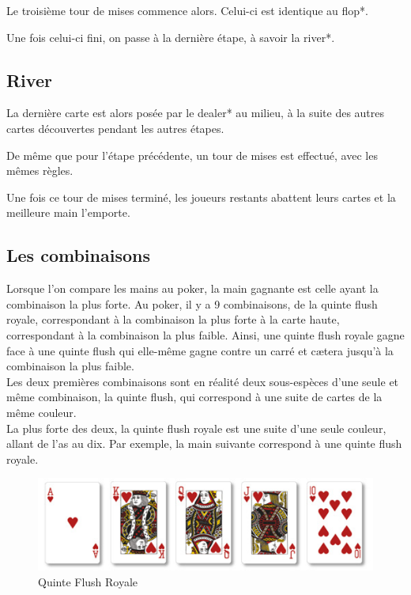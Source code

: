 \documentclass{report}
\begin{document}
Le troisième tour de mises commence alors. Celui-ci est identique au flop*.\par

Une fois celui-ci fini, on passe à la dernière étape, à savoir la river*.\par
\subsection{River}
\hspace{0.5cm}La dernière carte est alors posée par le dealer* au milieu, à la suite des autres cartes découvertes pendant les autres étapes. \par
De même que pour l'étape précédente, un tour de mises est effectué, avec les mêmes règles.\par
Une fois ce tour de mises terminé, les joueurs restants abattent leurs cartes et la meilleure main l'emporte.\par

\subsection{Les combinaisons}
\hspace{0.5cm}Lorsque l'on compare les mains au poker, la main gagnante est celle ayant la combinaison la plus forte. Au poker, il y a 9 combinaisons, de la quinte flush royale, correspondant à la combinaison la plus forte à la carte haute, correspondant à la combinaison la plus faible. Ainsi, une quinte flush royale gagne face à une quinte flush qui elle-même gagne contre un carré et cætera jusqu'à la combinaison la plus faible. \\

Les deux premières combinaisons sont en réalité deux sous-espèces d'une seule et même combinaison, la quinte flush, qui correspond à une suite de cartes de la même couleur.\\

La plus forte des deux, la quinte flush royale est une suite d'une seule couleur, allant de l'as au dix. Par exemple, la main suivante correspond à une quinte flush royale. \par

		\begin{figure}[h]
			\begin{center}
				\includegraphics[scale=0.3]{./imagesRapport/quinteFlushRoyale.jpg}
			\end{center}
			\caption[Quinte Flush Royale]{Quinte Flush Royale}
		\end{figure}
		\medskip
\end{document}
